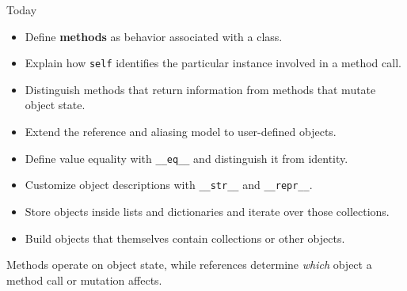 \documentclass[aspectratio=169,10pt]{beamer}
\begin{document}
\makedecktitle

\begin{frame}{Today}
  \begin{itemize}
    \item Define \textbf{methods} as behavior associated with a class.
    \item Explain how \texttt{self} identifies the particular instance involved in a method call.
    \item Distinguish methods that return information from methods that mutate object state.
    \item Extend the reference and aliasing model to user-defined objects.
    \item Define value equality with \texttt{\_\_eq\_\_} and distinguish it from identity.
    \item Customize object descriptions with \texttt{\_\_str\_\_} and \texttt{\_\_repr\_\_}.
    \item Store objects inside lists and dictionaries and iterate over those collections.
    \item Build objects that themselves contain collections or other objects.
  \end{itemize}

  \begin{keyidea}
    Methods operate on object state, while references determine \emph{which} object a method call or mutation affects.
  \end{keyidea}
\end{frame}
\end{document}
